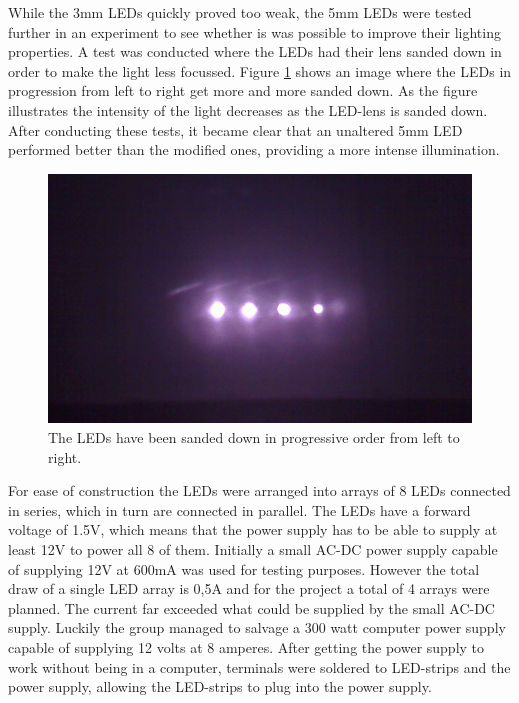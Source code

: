 While the 3mm LEDs quickly proved too weak, the 5mm LEDs were tested further in an experiment to see whether is was possible to improve their lighting properties. A test was conducted where the LEDs had their lens sanded down in order to make the light less focussed. Figure \ref{fig:leds_sanded} shows an image where the LEDs in progression from left to right get more and more sanded down. As the figure illustrates the intensity of the light decreases as the LED-lens is sanded down. After conducting these tests, it became clear that an unaltered 5mm LED performed better than the modified ones, providing a more intense illumination.

\begin{figure} [htbp]
\centering
\includegraphics[width=1.00\textwidth]{Pictures/Theory/sanded_leds.jpg}
\caption{The LEDs have been sanded down in progressive order from left to right.}
\label{fig:leds_sanded}
\end{figure}

For ease of construction the LEDs were arranged into arrays of 8 LEDs connected in series, which in turn are connected in parallel. The LEDs have a forward voltage of 1.5V, which means that the power supply has to be able to supply at least 12V to power all 8 of them. Initially a small AC-DC power supply capable of supplying 12V at 600mA was used for testing purposes. However the total draw of a single LED array is 0,5A and for the project a total of 4 arrays were planned. The current far exceeded what could be supplied by the small AC-DC supply. Luckily the group managed to salvage a 300 watt computer power supply capable of supplying 12 volts at 8 amperes. After getting the power supply to work without being in a computer, terminals were soldered to LED-strips and the power supply, allowing the LED-strips to plug into the power supply.

